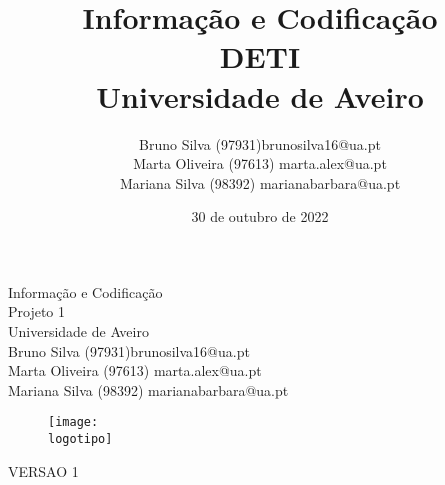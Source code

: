 \documentclass{report}
\begin{document}
%
\def\titulo{Informação e Codificação}
\def\subtitle{Projeto 1}
\def\data{30 de outubro de 2022}
\def\autores{Bruno Silva (97931)brunosilva16@ua.pt \\ Marta Oliveira (97613) marta.alex@ua.pt \\ Mariana Silva (98392) marianabarbara@ua.pt}
\def\versao{VERSAO 1}
\def\departamento{DETI}
\def\empresa{Universidade de Aveiro}
\def\logotipo{ua.pdf}
%
%
\renewcommand{\contentsname}{Índice}
\begin{titlepage}

\begin{center}
%
\vspace*{15mm}
%
{\Huge \titulo}\\
%
\vspace{10mm}
%
{\Huge \subtitle}\\
%
\vspace{10mm}
%
{\Large \empresa}\\
%
\vspace{10mm}
%
{\LARGE \autores}\\ 
%
\vspace{10mm}
%
\begin{figure}[h]
\center
\texttt{[image: \\logotipo]}
\end{figure}
%
\vspace{30mm}
\end{center}
%
\begin{flushright}
\versao
\end{flushright}
\end{titlepage}

\title{%
{\Huge\textbf{\titulo}}\\
{\Large \departamento\\ \empresa}
}
%
\author{%
    \autores
}
%
\date{\data}
%
\maketitle






\tableofcontents
 \listoffigures    %
\end{document}
